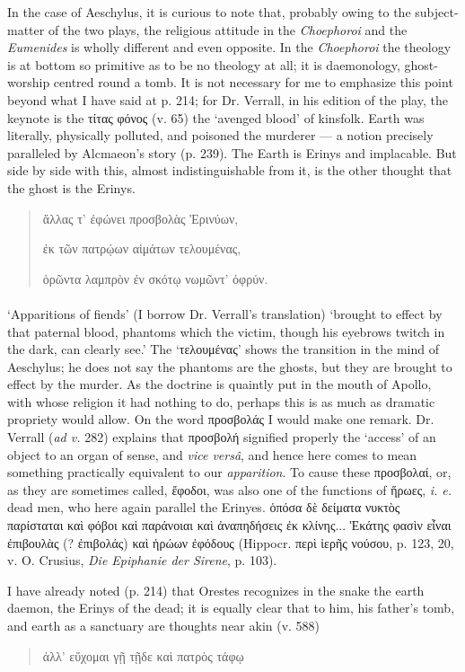 \documentclass[a4paper, 11pt, oneside, polutonikogreek, english]{article}
\begin{document}
In the case of Aeschylus, it is curious to note that, probably owing to the subject-matter of the two plays, the religious attitude in the \emph{Choephoroi} and the \emph{Eumenides} is wholly different and even opposite. In the \emph{Choephoroi} the theology is at bottom so primitive as to be no theology at all; it is daemonology, ghost-worship centred round a tomb. It is not necessary for me to emphasize this point beyond what I have said at p. 214; for Dr. Verrall, in his edition of the play, the keynote is the τίτας φόνος (v. 65) the `avenged blood' of kinsfolk. Earth was literally, physically polluted, and poisoned the murderer --- a notion precisely paralleled by Alcmaeon's story (p. 239). The Earth is Erinys and implacable. But side by side with this, almost indistinguishable from it, is the other thought that the ghost is the Erinys.
\begin{quotation}
ἄλλας τ' ἐφώνει προσβολὰς Ἐρινύων,

ἐκ τῶν πατρῴων αἱμάτων τελουμένας,

ὁρῶντα λαμπρὸν ἐν σκότῳ νωμῶντ' ὀφρύν.
\end{quotation}
\paragraph{}
`Apparitions of fiends' (I borrow Dr. Verrall's translation) `brought to effect by that paternal blood, phantoms which the victim, though his eyebrows twitch in the dark, can clearly see.' The `τελουμένας' shows the transition in the mind of Aeschylus; he does not say the phantoms are the ghosts, but they are brought to effect by the murder. As the doctrine is quaintly put in the mouth of Apollo, with whose religion it had nothing to do, perhaps this is as much as dramatic propriety would allow. On the word προσβολάς I would make one remark. Dr. Verrall (\emph{ad v.} 282) explains that προσβολή signified properly the `access' of an object to an organ of sense, and \emph{vice versâ}, and hence here comes to mean something practically equivalent to our \emph{apparition}. To cause these προσβολαί, or, as they are sometimes called, ἔφοδοι, was also one of the functions of ἥρωες, \emph{i. e.} dead men, who here again parallel the Erinyes. ὁπόσα δὲ δείματα νυκτὸς παρίσταται καὶ φόβοι καὶ παράνοιαι καὶ ἀναπηδήσεις ἐκ κλίνης... Ἑκάτης φασὶν εἶναι ἐπιβουλὰς (? ἐπιβολάς) καὶ ἡρώων ἐφόδους (Hippocr. περὶ ἱερῆς νούσου, p. 123, 20, v. O. Crusius, \emph{Die Epiphanie der Sirene}, p. 103).

I have already noted (p. 214) that Orestes recognizes in the snake the earth daemon, the Erinys of the dead; it is equally clear that to him, his father's tomb, and earth as a sanctuary are thoughts near akin (v. 588)
\begin{quotation}
ἀλλ' εὔχομαι γῇ τῇδε καὶ πατρὸς τάφῳ
\end{quotation}
\end{document}
